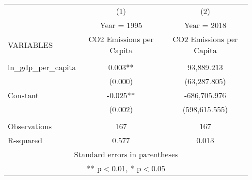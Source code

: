 \begin{tabular}{lcc} \hline
 & (1) & (2) \\
 & Year = 1995 & Year = 2018 \\
VARIABLES & CO2 Emissions per Capita & CO2 Emissions per Capita \\ \hline
 &  &  \\
ln\_gdp\_per\_capita & 0.003** & 93,889.213 \\
 & (0.000) & (63,287.805) \\
Constant & -0.025** & -686,705.976 \\
 & (0.002) & (598,615.555) \\
 &  &  \\
Observations & 167 & 167 \\
 R-squared & 0.577 & 0.013 \\ \hline
\multicolumn{3}{c}{ Standard errors in parentheses} \\
\multicolumn{3}{c}{ ** p$<$0.01, * p$<$0.05} \\
\end{tabular}
